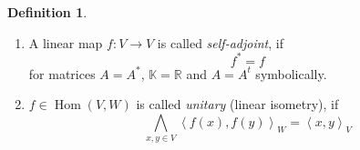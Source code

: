 \documentclass[a4paper,landscape,twocolumn]{article}
\newcommand\functional[1]{\left\langle{#1}\right\rangle}
\theoremstyle{definition}
\newtheorem{defi}{Definition}
\DeclareMathOperator\Hom{Hom} %
\begin{document}
\begin{defi}
  \label{defi-8.67}
  \begin{enumerate}
    \item
      A linear map $f: V \to V$ is called \emph{self-adjoint}, if
      \[ f^* = f \]
      for matrices $A = A^*$, $\mathbb K = \mathbb R$ and $A = A^t$ symbolically.
    \item
      $f \in \Hom(V,W)$ is called \emph{unitary} (linear isometry), if
      \[ \bigwedge_{x,y \in V} \functional{f(x), f(y)}_W = \functional{x, y}_V \]
  \end{enumerate}
\end{defi}
\end{document}
